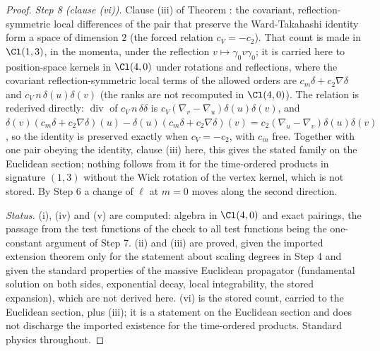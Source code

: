 \begin{proof}
\emph{Step 8 (clause (vi)).} Clause (iii) of Theorem : the covariant, reflection-symmetric local differences of the pair that preserve the Ward-Takahashi identity form a space of dimension $2$ (the forced relation $c_{V} = -c_{2}$). That count is made in $\Cl(1,3)$, in the momenta, under the reflection $v \mapsto \gamma_{0}v\gamma_{0}$; it is carried here to position-space kernels in $\Cl(4,0)$ under rotations and reflections, where the covariant reflection-symmetric local terms of the allowed orders are $c_{m}\delta + c_{2}\nabla\delta$ and $c_{V}\,n\,\delta(u)\delta(v)$ (the ranks are not recomputed in $\Cl(4,0)$). The relation is rederived directly: $\operatorname{div}$ of $c_{V}\,n\,\delta\delta$ is $c_{V}(\nabla_{v} - \nabla_{u})\delta(u)\delta(v)$, and $\delta(v)(c_{m}\delta + c_{2}\nabla\delta)(u) - \delta(u)(c_{m}\delta + c_{2}\nabla\delta)(v) = c_{2}(\nabla_{u} - \nabla_{v})\delta(u)\delta(v)$, so the identity is preserved exactly when $c_{V} = -c_{2}$, with $c_{m}$ free. Together with one pair obeying the identity, clause (iii) here, this gives the stated family on the Euclidean section; nothing follows from it for the time-ordered products in signature $(1,3)$ without the Wick rotation of the vertex kernel, which is not stored. By Step 6 a change of $\ell$ at $m = 0$ moves along the second direction.

\emph{Status.} (i), (iv) and (v) are computed: algebra in $\Cl(4,0)$ and exact pairings, the passage from the test functions of the check to all test functions being the one-constant argument of Step 7. (ii) and (iii) are proved, given the imported extension theorem only for the statement about scaling degrees in Step 4 and given the standard properties of the massive Euclidean propagator (fundamental solution on both sides, exponential decay, local integrability, the stored expansion), which are not derived here. (vi) is the stored count, carried to the Euclidean section, plus (iii); it is a statement on the Euclidean section and does not discharge the imported existence for the time-ordered products. Standard physics throughout.
\end{proof}
